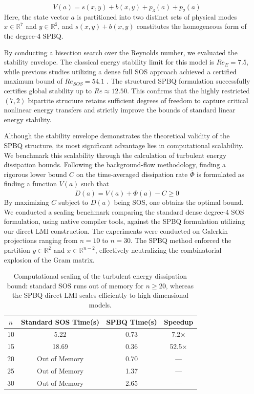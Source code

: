 \documentclass[12pt]{elsarticle}
\theoremstyle{definition}
\begin{document}
\[
V(a) = s(x, y) + b(x, y) + p_3(a) + p_2(a)
\]
Here, the state vector $a$ is partitioned into two distinct sets of physical modes $x \in \mathbb{R}^7$ and $y \in \mathbb{R}^2$, and $s(x,y) + b(x,y)$ constitutes the homogeneous form of the degree-4 SPBQ. 

By conducting a bisection search over the Reynolds number, we evaluated the stability envelope. The classical energy stability limit for this model is $Re_E = 7.5$, while previous studies utilizing a dense full SOS approach achieved a certified maximum bound of $Re_{SOS} = 54.1$ \cite{goulart2012global}. The structured SPBQ formulation successfully certifies global stability up to $Re \approx 12.50$. This confirms that the highly restricted $(7,2)$ bipartite structure retains sufficient degrees of freedom to capture critical nonlinear energy transfers and strictly improve the bounds of standard linear energy stability.

Although the stability envelope demonstrates the theoretical validity of the SPBQ structure, its most significant advantage lies in computational scalability. We benchmark this scalability through the calculation of turbulent energy dissipation bounds. Following the background-flow methodology, finding a rigorous lower bound $C$ on the time-averaged dissipation rate $\overline{\Phi}$ is formulated as finding a function $V(a)$ such that 
\[D(a) = \dot{V}(a) + \Phi(a) - C \ge 0
\]
By maximizing $C$ subject to $D(a)$ being SOS, one obtains the optimal bound. We conducted a scaling benchmark comparing the standard dense degree-4 SOS formulation, using native compiler tools, against the SPBQ formulation utilizing our direct LMI construction. The experiments were conducted on Galerkin projections ranging from $n=10$ to $n=30$. The SPBQ method enforced the partition $y \in \mathbb{R}^2$ and $x \in \mathbb{R}^{n-2}$, effectively neutralizing the combinatorial explosion of the Gram matrix.

\begin{table}[ht]
\centering
\begin{tabular}{|c | c | c | c |}
\hline\hline
$n$ & Standard SOS Time(s) & SPBQ Time(s) & Speedup \\
\hline
10 & 5.22 & 0.73 & 7.2$\times$ \\
15 & 18.69 & 0.36 & 52.5$\times$ \\
20 & Out of Memory & 0.70 & --- \\
25 & Out of Memory & 1.37 & --- \\
30 & Out of Memory & 2.65 & --- \\
\hline\hline
\end{tabular}
\caption{Computational scaling of the turbulent energy dissipation bound: standard SOS runs out of memory for $n \ge 20$, whereas the SPBQ direct LMI scales efficiently to high-dimensional models.}
\label{tab:scaling_benchmark_fluid}
\end{table}
\end{document}
